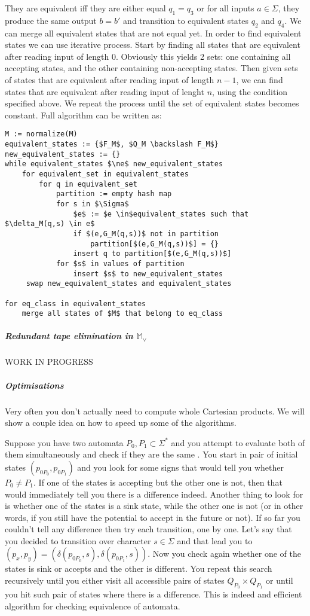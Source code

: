 \documentclass[12pt]{article}
\begin{document}
They are equivalent iff they are either equal $q_1=q_3$ or for all inputs $a\in\Sigma$, they produce the same output $b=b'$ and transition  to equivalent states $q_2$ and $q_4$. We can merge all equivalent states that are not equal yet. In order to find equivalent states we can use iterative process. 
Start by finding all states that are equivalent after reading input of length 0. Obviously this yields 2 sets: one containing all accepting states, and the other containing non-accepting states. Then given sets of states that are equivalent after reading input of length $n-1$, we can find states that are equivalent after reading input of lenght $n$, using the condition specified above. We repeat the process until the set of equivalent states becomes constant.
Full algorithm can be written as:
\begin{lstlisting}
M := normalize(M)
equivalent_states := {$F_M$, $Q_M \backslash F_M$}
new_equivalent_states := {} 
while equivalent_states $\ne$ new_equivalent_states
    for equivalent_set in equivalent_states
        for q in equivalent_set
            partition := empty hash map 
            for s in $\Sigma$
                $e$ := $e \in$equivalent_states such that $\delta_M(q,s) \in e$
                if $(e,G_M(q,s))$ not in partition 
                    partition[$(e,G_M(q,s))$] = {}
                insert q to partition[$(e,G_M(q,s))$]
            for $s$ in values of partition
                insert $s$ to new_equivalent_states
     swap new_equivalent_states and equivalent_states 

for eq_class in equivalent_states
    merge all states of $M$ that belong to eq_class
\end{lstlisting}


\subparagraph{Redundant tape elimination in $\mathbb{M}_\vee$} 
WORK IN PROGRESS


\subparagraph{Optimisations}
Very often you don't actually need to compute whole Cartesian products. We will show a couple idea on how to speed up some of the algorithms.


Suppose you have two automata $P_0,P_1 \subset \Sigma^*$ and you attempt to evaluate both of them simultaneously and check if they are the same . You start in pair of initial states $(p_{0P_0},p_{0P_1})$ and you look for some signs that would tell you whether $P_0 \ne P_1$. If one of the states is accepting but the other one is not, then that would immediately tell you there is a difference indeed. Another thing to look for is whether one of the states is a sink state, while the other one is not (or in other words, if you still have the potential to accept in the future or not). If so far you couldn't tell any difference then try each transition, one by one. Let's say that you decided to transition over character $s \in \Sigma$ and that lead you to $(p_x,p_y) = (\delta(p_{0P_0},s),\delta(p_{0P_1},s))$. Now you check again whether one of the states is sink or accepts and the other is different. You repeat this search recursively until you either visit all accessible pairs of states $Q_{P_0} \times Q_{P_1}$ or until you hit such pair of states where there is a difference. This is indeed and efficient algorithm for checking equivalence of automata. 
\end{document}
